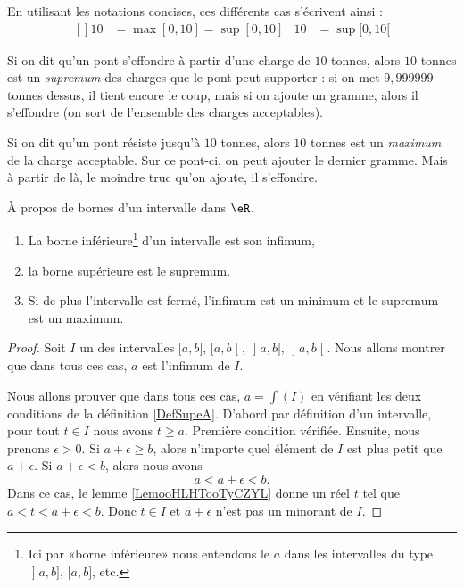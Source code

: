 En utilisant les notations concises, ces différents cas s'écrivent ainsi :
\begin{equation}
	\begin{aligned}[]
		10 & =\max[0,10]=\sup[0,10] & 10 & =\sup[0,10[
	\end{aligned}
\end{equation}


\begin{example}
	Si on dit qu'un pont s'effondre à partir d'une charge de \( 10\) tonnes, alors \( 10\) tonnes est un \emph{supremum} des charges que le pont peut supporter : si on met \( 9,999999\) tonnes dessus, il tient encore le coup, mais si on ajoute un gramme, alors il s'effondre (on sort de l'ensemble des charges acceptables).
\end{example}

\begin{example}
	Si on dit qu'un pont résiste jusqu'à \( 10\) tonnes, alors \( 10\) tonnes est un \emph{maximum} de la charge acceptable. Sur ce pont-ci, on peut ajouter le dernier gramme. Mais à partir de là, le moindre truc qu'on ajoute, il s'effondre.
\end{example}

\begin{lemma}       \label{LEMooWCUXooFqTwDK}
    À propos de bornes d'un intervalle dans \( \eR\).
	\begin{enumerate}
		\item
    La borne inférieure\footnote{Ici par «borne inférieure» nous entendons le \( a\) dans les intervalles du type \( \mathopen] a , b \mathclose] \), \( \mathopen[ a , b \mathclose]\), etc.} d'un intervalle est son infimum,
		\item
		      la borne supérieure est le supremum.
		\item
		      Si de plus l'intervalle est fermé, l'infimum est un minimum et le supremum est un maximum.
	\end{enumerate}
\end{lemma}

\begin{proof}
    Soit \( I\) un des intervalles \( \mathopen[ a , b \mathclose]\), \( \mathopen[ a , b \mathclose[\), \( \mathopen] a , b \mathclose]\), \( \mathopen] a , b \mathclose[\). Nous allons montrer que dans tous ces cas, \( a\) est l'infimum de \( I\).

    Nous allons prouver que dans tous ces cas, \( a=\int(I)\) en vérifiant les deux conditions de la définition \ref{DefSupeA}. D'abord par définition d'un intervalle, pour tout \( t\in I\) nous avons \( t\geq a\). Première condition vérifiée. Ensuite, nous prenons \( \epsilon>0\). Si \( a+\epsilon\geq b\), alors n'importe quel élément de \( I\) est plus petit que \( a+\epsilon\). Si \( a+\epsilon<b\), alors nous avons
    \begin{equation}
        a<a+\epsilon<b.
    \end{equation}
    Dans ce cas, le lemme \ref{LemooHLHTooTyCZYL} donne un réel \( t\) tel que \( a<t<a+\epsilon<b\). Donc \( t\in I\) et \( a+\epsilon\) n'est pas un minorant de \( I\).
\end{proof}



